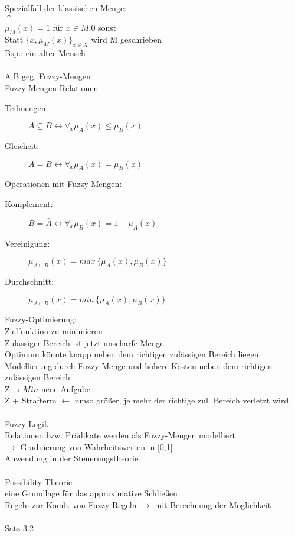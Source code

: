 \documentclass[a4paper,14pt]{article}
\begin{document}
Spezialfall der klassischen Menge:\\
$\uparrow$\\
$\mu_M(x)=1$ für $x\in M$;0 sonst\\
Statt $\{x,\mu_M(x)\}_{x\in X}$ wird M geschrieben\\
Bsp.: \glqq{}ein alter Mensch\grqq{}\\
\\
A,B geg. Fuzzy-Mengen\\
Fuzzy-Mengen-Relationen\\
\begin{description}
 \item[Teilmengen:] $A\subseteq B \leftrightarrow \forall_x\mu_A(x)\leq\mu_B(x)$
 \item[Gleicheit:] $A=B\leftrightarrow\forall_x\mu_A(x)=\mu_B(x)$
\end{description}
Operationen mit Fuzzy-Mengen:
\begin{description}
 \item[Komplement:] $B=\bar{A} \leftrightarrow \forall_x \mu_B(x) = 1-\mu_A(x)$
 \item[Vereinigung:] $\mu_{A\cup B}(x) = max\,\{\mu_A(x),\mu_B(x)\}$
 \item[Durchschnitt:] $\mu_{A\cap B}(x) = min\,\{\mu_A(x),\mu_B(x)\} $
\end{description}
Fuzzy-Optimierung:\\
Zielfunktion zu minimieren\\
Zulässiger Bereich ist jetzt unscharfe Menge\\
Optimum könnte knapp neben dem \glqq{}richtigen\grqq{} zulässigen Bereich liegen\\
Modellierung durch Fuzzy-Menge und höhere \glqq{}Kosten\grqq{} neben dem \glqq{}richtigen\grqq{} zulässigen Bereich\\
Z$\rightarrow Min $ neue Aufgabe\\
Z + Strafterm $\leftarrow$ umso größer, je mehr der \glqq{}richtige\grqq{} zul. Bereich verletzt wird.\\
\\
Fuzzy-Logik\\
Relationen bzw. Prädikate werden als Fuzzy-Mengen modelliert\\
$\rightarrow$ Graduierung  von Wahrheitswerten in [0,1]\\
Anwendung in der Steuerungstheorie\\
\\
Possibility-Theorie\\
eine Grundlage für das \glqq{}approximative Schließen\grqq{}\\
Regeln zur Komb. von Fuzzy-Regeln $\rightarrow$ mit Berechnung der Möglichkeit\\
\\
Satz 3.2
\end{document}
